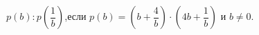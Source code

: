 \begin{ex}[type=calculate_expression]
	\begin{condition}
		\( p(b):p\left( \dfrac{1}{b} \right) \),\quad если \( p(b)=\left( b+\dfrac{4}{b} \right)\cdot\left( 4b+\dfrac{1}{b} \right) \) и \( b\neq0 \).
	\end{condition}
\end{ex}
